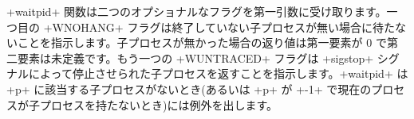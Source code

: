 \ml+waitpid+ 関数は二つのオプショナルなフラグを第一引数に受け取ります。一つ目の \ml+WNOHANG+ フラグは終了していない子プロセスが無い場合に待たないことを指示します。子プロセスが無かった場合の返り値は第一要素が 0 で第二要素は未定義です。もう一つの \ml+WUNTRACED+ フラグは \ml+sigstop+ シグナルによって停止させられた子プロセスを返すことを指示します。\ml+waitpid+ は \ml+p+ に該当する子プロセスがないとき(あるいは \ml+p+ が \ml+-1+ で現在のプロセスが子プロセスを持たないとき)には例外を出します。

